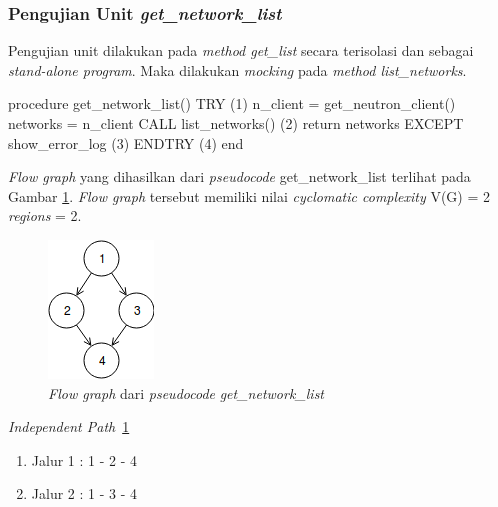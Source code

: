 \subsubsection{Pengujian Unit \emph{get\_network\_list}}

Pengujian unit dilakukan pada \emph{method get\_list} secara
terisolasi dan sebagai \emph{stand-alone program}.  Maka dilakukan
\emph{mocking} pada \emph{method list\_networks}.

\begin{code}
\begin{ignasicblock}[title=get\_network\_list,minted language=text]
procedure get_network_list()
    TRY                                          (1)
        n_client = get_neutron_client()
        networks = n_client CALL list_networks() (2)
        return networks
    EXCEPT
        show_error_log                           (3)
    ENDTRY                                       (4)
end
\end{ignasicblock}
\label{pc:get_list_network}
\end{code}

\par\null\par
\noindent
\emph{Flow graph} yang dihasilkan dari \emph{pseudocode}
get\_network\_list terlihat pada Gambar \ref{cfg:get_list_network}.
\emph{Flow graph} tersebut memiliki nilai \emph{cyclomatic complexity} V(G) = 2 \emph{regions} = 2.

\begin{figure}[H]
  \centering
  \includegraphics[width=.14\linewidth]{img/test-case/4node}
  \caption{\emph{Flow graph} dari \emph{pseudocode} \emph{get\_network\_list}}
  \label{cfg:get_list_network}
\end{figure}

\noindent
\emph{Independent Path}~\ref{cfg:get_list_network}

\begin{enumerate}
\item Jalur 1 : 1 - 2 - 4
\item Jalur 2 : 1 - 3 - 4
\end{enumerate}


